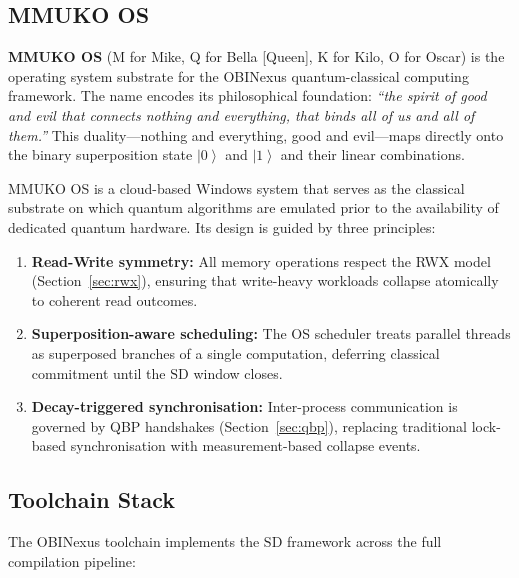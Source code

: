 \documentclass[11pt]{article}
\theoremstyle{plain}
\theoremstyle{definition}
\theoremstyle{remark}
\newcommand{\ket}[1]{\left| #1 \right\rangle}
\newcommand{\SD}{\ensuremath{\mathrm{SD}}}   %
\begin{document}
\subsection{MMUKO OS}

\textbf{MMUKO OS} (M for Mike, Q for Bella [Queen], K for Kilo, O for Oscar)
is the operating system substrate for the OBINexus quantum-classical computing
framework.  The name encodes its philosophical foundation: \emph{``the spirit
of good and evil that connects nothing and everything, that binds all of us and
all of them.''} This duality---nothing and everything, good and evil---maps
directly onto the binary superposition state $\ket{0}$ and $\ket{1}$ and their
linear combinations.

MMUKO OS is a cloud-based Windows system that serves as the classical
substrate on which quantum algorithms are emulated prior to the availability
of dedicated quantum hardware.  Its design is guided by three principles:

\begin{enumerate}
  \item \textbf{Read-Write symmetry:}  All memory operations respect the RWX
        model (Section~\ref{sec:rwx}), ensuring that write-heavy workloads
        collapse atomically to coherent read outcomes.
  \item \textbf{Superposition-aware scheduling:}  The OS scheduler treats
        parallel threads as superposed branches of a single computation,
        deferring classical commitment until the \SD{} window closes.
  \item \textbf{Decay-triggered synchronisation:}  Inter-process
        communication is governed by QBP handshakes
        (Section~\ref{sec:qbp}), replacing traditional lock-based
        synchronisation with measurement-based collapse events.
\end{enumerate}

\subsection{Toolchain Stack}

The OBINexus toolchain implements the \SD{} framework across the full
compilation pipeline:
\end{document}
